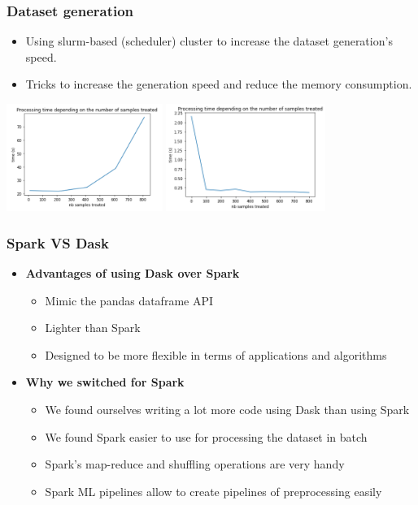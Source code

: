 \documentclass[slidestop,compress,red,mathserif]{beamer}
\begin{document}
\begin{frame}
	\frametitle{Dataset generation}
	\begin{itemize}
		\item Using slurm-based (scheduler) cluster to increase the dataset generation's speed.
    \item Tricks to increase the generation speed and reduce the memory consumption.
	\end{itemize}
\centering
\includegraphics[height=3.5cm, keepaspectratio]{Figures/timeVSsamples_generatepositivesamples.png}
\includegraphics[height=3.5cm, keepaspectratio]{Figures/timeVSsamples_generatepositivesamples_after.png}
\end{frame}

\begin{frame}
	\frametitle{Spark VS Dask}
	\begin{itemize}
    \item[] \textbf{Advantages of using Dask over Spark}
      \begin{itemize}
      	\item Mimic the pandas dataframe API
        \item Lighter than Spark
      	\item Designed to be more flexible in terms of applications and algorithms
      \end{itemize}
    \item[] \textbf{Why we switched for Spark}
      \begin{itemize}
        \item We found ourselves writing a lot more code using Dask than using Spark
        \item We found Spark easier to use for processing the dataset in batch
        \item Spark's map-reduce and shuffling operations are very handy
        \item Spark ML pipelines allow to create pipelines of preprocessing easily
      \end{itemize}
	\end{itemize}
\end{frame}
\end{document}
